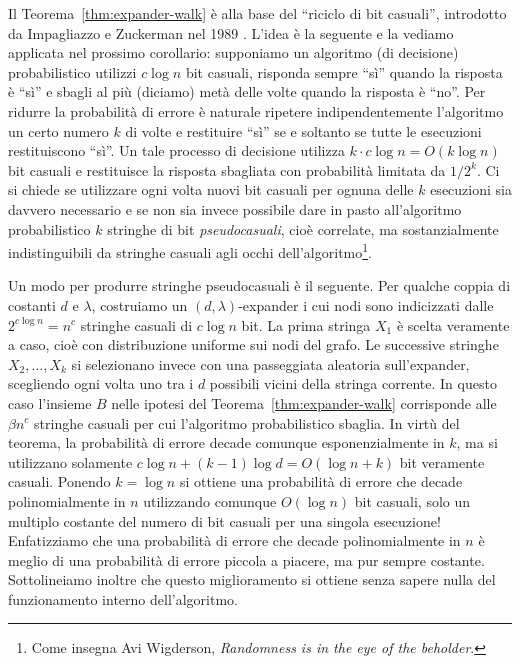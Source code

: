 Il Teorema~\ref{thm:expander-walk} è alla base del ``riciclo di bit casuali'',
introdotto da Impagliazzo e Zuckerman nel 1989 \cite{IZ89}.
L'idea è la seguente e la vediamo applicata nel prossimo corollario: supponiamo
un algoritmo (di decisione) probabilistico utilizzi $c \log n$ bit casuali,
risponda sempre ``sì'' quando la risposta è ``sì'' e sbagli al più (diciamo)
metà delle volte quando la risposta è ``no''.
Per ridurre la probabilità di errore è naturale ripetere
indipendentemente l'algoritmo un certo numero $k$ di volte e restituire ``sì''
se e soltanto se tutte le esecuzioni restituiscono ``sì''.
Un tale processo di decisione utilizza $k \cdot c \log n = O(k \log n)$ bit
casuali e restituisce la risposta sbagliata con probabilità limitata da $1/2^k$.
Ci si chiede se utilizzare ogni volta nuovi bit casuali per ognuna delle $k$
esecuzioni sia davvero necessario e se non sia invece possibile dare in pasto
all'algoritmo probabilistico $k$ stringhe di bit \emph{pseudocasuali}, cioè
correlate, ma sostanzialmente indistinguibili da stringhe casuali agli occhi
dell'algoritmo\footnote{Come insegna Avi Wigderson, \emph{Randomness is in the
eye of the beholder}.}.

Un modo per produrre stringhe pseudocasuali è il seguente. Per qualche coppia
di costanti $d$ e $\lambda$, costruiamo un $(d, \lambda)$-expander i cui nodi
sono indicizzati dalle $2^{c \log n} = n^c$ stringhe casuali di $c \log n$ bit.
La prima stringa $X_1$ è scelta veramente a caso, cioè con distribuzione
uniforme sui nodi del grafo. Le successive stringhe $X_2, \dots, X_k$ si
selezionano invece con una passeggiata aleatoria sull'expander, scegliendo ogni
volta uno tra i $d$ possibili vicini della stringa corrente.
In questo caso l'insieme $B$ nelle ipotesi del Teorema~\ref{thm:expander-walk}
corrisponde alle $\beta n^c$ stringhe casuali per cui l'algoritmo probabilistico
sbaglia. In virtù del teorema, la probabilità di errore decade comunque
esponenzialmente in $k$, ma si utilizzano solamente
$c \log n + (k - 1) \log d = O(\log n + k)$ bit veramente casuali.
Ponendo $k = \log n$ si ottiene una probabilità di errore che decade
polinomialmente in $n$ utilizzando comunque $O(\log n)$ bit casuali, solo un
multiplo costante del numero di bit casuali per una singola esecuzione!
Enfatizziamo che una probabilità di errore che decade polinomialmente in $n$ è
meglio di una probabilità di errore piccola a piacere, ma pur sempre costante.
Sottolineiamo inoltre che questo miglioramento si ottiene senza sapere nulla del
funzionamento interno dell'algoritmo.


